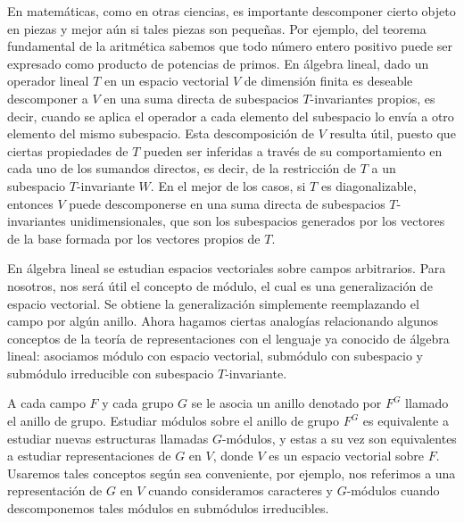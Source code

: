 \documentclass[12pt]{book}
\theoremstyle{definition}
\newcounter{in}
\newcounter{ini}
\begin{document}
En matemáticas, como en otras ciencias, es importante descomponer cierto
objeto en piezas y mejor aún si tales piezas son pequeñas. Por
ejemplo, del teorema fundamental de la aritmética sabemos que todo número
entero positivo puede ser expresado como producto de potencias de
primos. %
En álgebra lineal,
dado un operador lineal $T$ en un espacio vectorial $V$ de
dimensión finita es deseable descomponer a $V$ en una suma directa de
subespacios $T$-invariantes propios, es decir, cuando se aplica el
operador a cada elemento del subespacio lo envía a otro elemento
del mismo subespacio. Esta descomposición de $V$ resulta útil, puesto que ciertas
propiedades de $T$ pueden ser inferidas a través de su comportamiento
en cada uno de los sumandos directos, es decir, de la restricción de
$T$ a un subespacio $T$-invariante $W$.
En el mejor de los casos, si $T$ es diagonalizable, entonces $V$ puede
descomponerse en una suma directa de subespacios $T$-invariantes
unidimensionales, que son los subespacios generados por los vectores
de la base formada por los vectores propios de $T$. 

En álgebra lineal se estudian espacios vectoriales sobre campos
arbitrarios. Para nosotros, nos será útil el concepto de módulo, el cual es una generalización de espacio
vectorial. Se obtiene la generalización simplemente reemplazando el
campo por algún anillo. Ahora hagamos ciertas analogías relacionando
algunos conceptos de la teoría de representaciones con el lenguaje ya
conocido de álgebra lineal: asociamos módulo con espacio vectorial, submódulo con
subespacio y submódulo irreducible con subespacio $T$-invariante.

A cada campo $F$ y cada grupo $G$ se le asocia un anillo denotado por
$F^{G}$ llamado el anillo de grupo. Estudiar módulos sobre el
anillo de grupo $F^{G}$ es equivalente a estudiar nuevas estructuras
llamadas $G$-módulos, y estas a su
vez son equivalentes a estudiar representaciones de $G$ en
$V$, donde $V$ es un espacio vectorial sobre $F$. Usaremos
tales conceptos según sea conveniente, por ejemplo, nos referimos a
una representación de $G$ en $V$ cuando consideramos caracteres y
$G$-módulos cuando descomponemos tales módulos en submódulos
irreducibles. 
\end{document}
